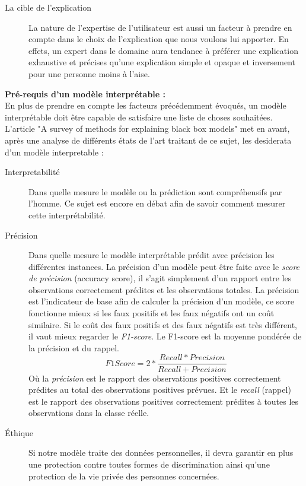 \begin{description}
\item[La cible de l'explication] La nature de l'expertise de l'utilisateur est aussi un facteur à prendre en compte dans le choix de l'explication que nous voulons lui apporter. En effets, un expert dans le domaine aura tendance à préférer une explication exhaustive et précises qu'une explication simple et opaque et inversement pour une personne moins à l'aise.
\end{description}

\textbf{Pré-requis d'un modèle interprétable :}\\

En plus de prendre en compte les facteurs précédemment évoqués, un modèle interprétable doit être capable de satisfaire une liste de choses souhaitées. L'article "A survey of methods for explaining black box models"\cite{surveyExplaining} met en avant, après une analyse de différents états de l'art traitant de ce sujet, les desiderata d'un modèle interpretable :
\begin{description}
\item[Interpretabilité] Dans quelle mesure le modèle ou la prédiction sont compréhensifs par l'homme. Ce sujet est encore en débat afin de savoir comment mesurer cette interprétabilité.

\item[Précision] Dans quelle mesure le modèle interprétable prédit avec précision les différentes instances. La précision d'un modèle peut être faite avec le \textit{score de précision} (accuracy score), il s'agit simplement d'un rapport entre les observations correctement prédites et les observations totales. La précision est l'indicateur de base afin de calculer la précision d'un modèle, ce score fonctionne mieux si les faux positifs et les faux négatifs ont un coût similaire. Si le coût des faux positifs et des faux négatifs est très différent, il vaut mieux regarder le \textit{F1-score}. Le F1-score est la moyenne pondérée de la précision et du rappel.
\[
F1 Score = 2*\frac{Recall * Precision}{Recall + Precision}
\]
Où la \textit{précision} est le rapport des observations positives correctement prédites au total des observations positives prévues. Et le \textit{recall} (rappel) est le rapport des observations positives correctement prédites à toutes les observations dans la classe réelle.

\item[Éthique] Si notre modèle traite des données personnelles, il devra garantir en plus une protection contre toutes formes de discrimination ainsi qu'une protection de la vie privée des personnes concernées.\\
\end{description}

